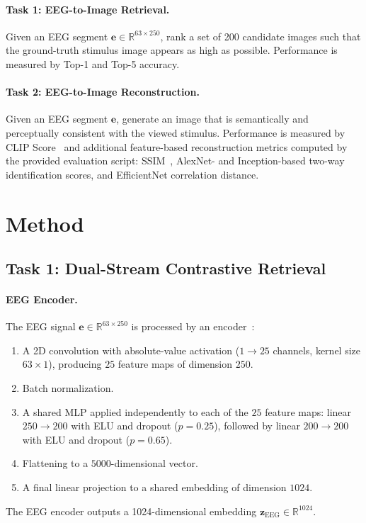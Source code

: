 \documentclass[11pt]{article}
\begin{document}
\paragraph{Task 1: EEG-to-Image Retrieval.}
Given an EEG segment $\mathbf{e} \in \mathbb{R}^{63 \times 250}$, rank a set of 200 candidate images such that the ground-truth stimulus image appears as high as possible.
Performance is measured by Top-1 and Top-5 accuracy.

\paragraph{Task 2: EEG-to-Image Reconstruction.}
Given an EEG segment $\mathbf{e}$, generate an image that is semantically and perceptually consistent with the viewed stimulus.
Performance is measured by CLIP Score~\citep{radford2021clip} and additional feature-based reconstruction metrics computed by the provided evaluation script: SSIM~\citep{wang2004ssim}, AlexNet- and Inception-based two-way identification scores, and EfficientNet correlation distance.

\section{Method}

\subsection{Task 1: Dual-Stream Contrastive Retrieval}

\paragraph{EEG Encoder.}
The EEG signal $\mathbf{e} \in \mathbb{R}^{63 \times 250}$ is processed by an encoder~\citep{ved2026}:
\begin{enumerate}[leftmargin=*, topsep=2pt, itemsep=1pt]
  \item A 2D convolution with absolute-value activation ($1 \to 25$ channels, kernel size $63 \times 1$), producing $25$ feature maps of dimension $250$.
  \item Batch normalization.
  \item A shared MLP applied independently to each of the $25$ feature maps: linear $250 \to 200$ with ELU and dropout ($p = 0.25$), followed by linear $200 \to 200$ with ELU and dropout ($p = 0.65$).
  \item Flattening to a $5000$-dimensional vector.
  \item A final linear projection to a shared embedding of dimension $1024$.
\end{enumerate}
The EEG encoder outputs a 1024-dimensional embedding $\mathbf{z}_\text{EEG} \in \mathbb{R}^{1024}$.
\end{document}
